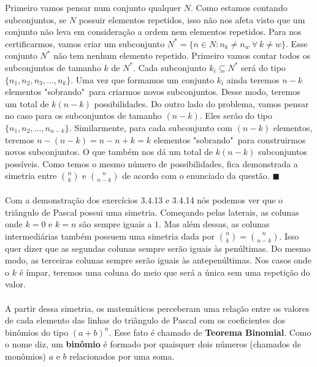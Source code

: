 \documentclass[a4paper,11pt]{book}
\theoremstyle{definition}
\theoremstyle{break}
\begin{document}
Primeiro vamos pensar num conjunto qualquer $N$. Como estamos contando subconjuntos, se $N$ possuir elementos repetidos, isso não nos afeta visto que um conjunto não leva em consideração a ordem nem elementos repetidos. Para nos certificarmos, vamos criar um subconjunto $N^* = \{n \in N : n_k \neq n_w \ \forall \  k \neq w \}$. Esse conjunto $N^*$ não tem nenhum elemento repetido. Primeiro vamos contar todos os subconjuntos de tamanho $k$ de $N^*$. Cada subconjunto $k_i \subseteq N^*$ será do tipo $\{n_1,n_2,n_3,...,n_k\}$. Uma vez que formamos um conjunto $k_i$ ainda teremos $n - k$ elementos "sobrando"\ para criarmos novos subconjuntos. Desse modo, teremos um total de $k(n-k)$ possibilidades. Do outro lado do problema, vamos pensar no caso para os subconjuntos de tamanho $(n-k)$. Eles serão do tipo $\{n_1,n_2,...,n_{n-k}\}$. Similarmente, para cada subconjunto com $(n-k)$ elementos, teremos $n-(n-k)=n-n+k=k$ elementos "sobrando"\ para construirmos novos subconjuntos. O que também nos dá um total de $k(n-k)$ subconjuntos possíveis. Como temos o mesmo número de possibilidades, fica demonstrada a simetria entre ${n \choose k}$ e ${n \choose n-k}$ de acordo com o enunciado da questão. $\blacksquare$
\\
\\
Com a demonstração dos exercícios 3.4.13 e 3.4.14 nós podemos ver que o triângulo de Pascal possui uma simetria. Começando pelas laterais, as colunas onde $k = 0$ e $k = n$ são sempre iguais a $1$. Mas além dessas, as colunas intermediárias também possuem uma simetria dada por ${n \choose k} = {n \choose n-k}$. Isso quer dizer que as segundas colunas sempre serão iguais às penúltimas. Do mesmo modo, as terceiras colunas sempre serão iguais às antepenúltimas. Nos casos onde o $k$ é ímpar, teremos uma coluna do meio que será a única sem uma repetição do valor.
\\
\\
A partir dessa simetria, os matemáticos perceberam uma relação entre os valores de cada elemento das linhas do triângulo de Pascal com os coeficientes dos binômios do tipo $(a+b)^n$. Esse fato é chamado de \textbf{Teorema Binomial}. Como o nome diz, um \textbf{binômio} é formado por quaisquer dois números (chamados de monômios) $a$ e $b$ relacionados por uma soma.

\pagebreak
\end{document}
